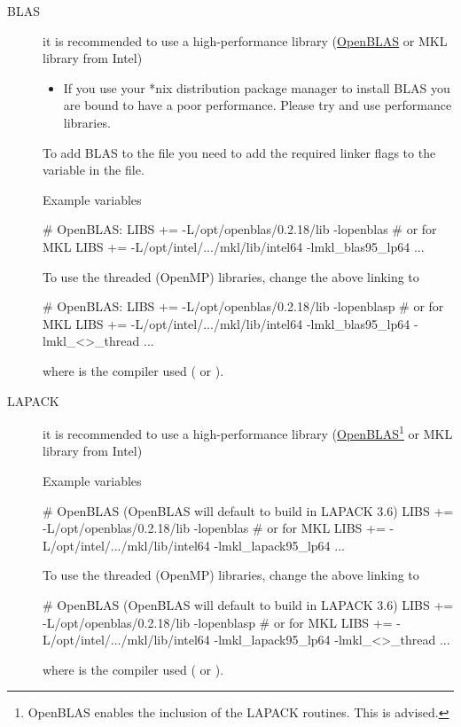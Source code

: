 \begin{description}

  \item[BLAS] %
  it is recommended to use a high-performance library
  (\href{https://github.com/xianyi/OpenBLAS}{OpenBLAS} or MKL
  library from Intel)
  
  \begin{itemize}
    \item If you use your *nix distribution package manager to install
    BLAS you are bound to have a poor performance. Please try and use
    performance libraries.
  \end{itemize}

  To add BLAS to the  file you need to add the
  required linker flags to the  variable in the
   file.

  Example variables
\begin{shellexample}
  # OpenBLAS:
  LIBS += -L/opt/openblas/0.2.18/lib -lopenblas
  # or for MKL
  LIBS += -L/opt/intel/.../mkl/lib/intel64 -lmkl_blas95_lp64 ...
\end{shellexample}

  To use the threaded (OpenMP) libraries, change the above linking
  to
\begin{shellexample}
  # OpenBLAS:
  LIBS += -L/opt/openblas/0.2.18/lib -lopenblasp
  # or for MKL
  LIBS += -L/opt/intel/.../mkl/lib/intel64 -lmkl_blas95_lp64
    -lmkl_<>_thread ...
\end{shellexample}
  where \shell{<>} is the compiler used ( or ).

  \item[LAPACK]%
  it is recommended to use a high-performance library
  (\href{https://github.com/xianyi/OpenBLAS}{OpenBLAS}\footnote{OpenBLAS
      enables the inclusion of the LAPACK routines. This is advised.}
  or MKL library from Intel)

  Example variables
\begin{shellexample}
  # OpenBLAS (OpenBLAS will default to build in LAPACK 3.6)
  LIBS += -L/opt/openblas/0.2.18/lib -lopenblas
  # or for MKL
  LIBS += -L/opt/intel/.../mkl/lib/intel64 -lmkl_lapack95_lp64 ...
\end{shellexample}

  To use the threaded (OpenMP) libraries, change the above linking
  to
\begin{shellexample}
  # OpenBLAS (OpenBLAS will default to build in LAPACK 3.6)
  LIBS += -L/opt/openblas/0.2.18/lib -lopenblasp
  # or for MKL
  LIBS += -L/opt/intel/.../mkl/lib/intel64 -lmkl_lapack95_lp64
    -lmkl_<>_thread ...
\end{shellexample}
  where \shell{<>} is the compiler used ( or ).



\end{description}
